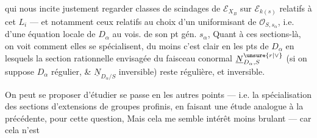 qui nous incite justement  regarder  classes de scindages\unsure{,} de $\mathcal E_{X_B}$ sur $\mathcal E_{k(s)}$ relatifs à cet $L_i$ --- et notamment ceux relatifs au choix d'un uniformisant de $\mathcal O_{S,s_\alpha}$, i.e. d'une équation locale de $D_\alpha$ au vois. de son pt gén. $s_\alpha$,   Quant à ces sections-là, on voit comment elles se spécialisent, du moins c'est clair en les pts de $D_\alpha$ en lesquels la section rationnelle envisagée du faisceau conormal $\underline N_{D_\alpha,S}^{\unsure{r|\vee}}$ (si on suppose $D_\alpha$ régulier, \&  $\underline N_{D_\alpha/S}$ inversible) reste régulière, et inversible.

On peut se proposer d'étudier   se passe en les autres points --- i.e. la spécialisation des sections  d'extensions de groupes profinis, en faisant une étude analogue à la précédente, pour cette question, Mais cela me semble   intérêt moins brulant --- car cela n'est
